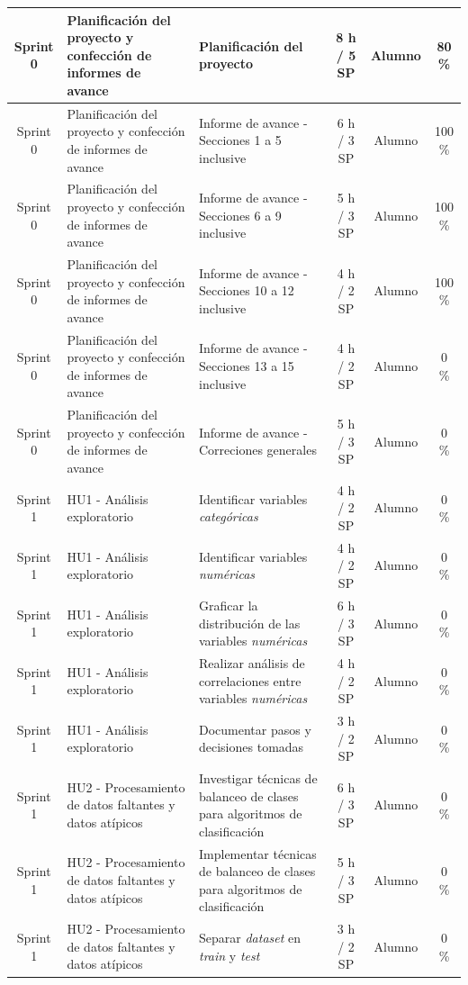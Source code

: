 \documentclass[
11pt, %
]{charter}
\begin{document}
\begin{xltabular}{\linewidth}{@{}|c|X|X|c|c|c|@{}}
\hline
\endlastfoot
Sprint 0 & Planificación del proyecto y confección de informes de avance & Planificación del proyecto & 8 h / 5 SP & Alumno & 80 \%\\ \hline
Sprint 0 & Planificación del proyecto y confección de informes de avance & Informe de avance - Secciones 1 a 5 inclusive  & 6 h / 3 SP & Alumno & 100 \% \\ \hline
Sprint 0 & Planificación del proyecto y confección de informes de avance & Informe de avance - Secciones 6 a 9 inclusive  & 5 h / 3 SP & Alumno & 100 \% \\ \hline
Sprint 0 & Planificación del proyecto y confección de informes de avance & Informe de avance - Secciones 10 a 12 inclusive  & 4 h / 2 SP & Alumno & 100 \% \\ \hline
Sprint 0 & Planificación del proyecto y confección de informes de avance & Informe de avance - Secciones 13 a 15 inclusive  & 4 h / 2 SP & Alumno & 0 \% \\ \hline
Sprint 0 & Planificación del proyecto y confección de informes de avance & Informe de avance - Correciones generales  & 5 h / 3 SP & Alumno & 0 \% \\ \hline
Sprint 1 & HU1 - Análisis exploratorio  & Identificar variables \textit{categóricas} & 4 h / 2 SP & Alumno & 0 \% \\ \hline
Sprint 1 & HU1 - Análisis exploratorio  & Identificar variables \textit{numéricas} & 4 h / 2 SP & Alumno & 0 \% \\ \hline
Sprint 1 & HU1 - Análisis exploratorio  & Graficar la distribución de las variables \textit{numéricas} & 6 h / 3 SP & Alumno & 0 \% \\ \hline
Sprint 1 & HU1 - Análisis exploratorio  & Realizar análisis de correlaciones entre variables \textit{numéricas}  & 4 h / 2 SP & Alumno & 0 \% \\ \hline
Sprint 1 & HU1 - Análisis exploratorio  & Documentar pasos y decisiones tomadas  & 3 h / 2 SP & Alumno & 0 \% \\ \hline
Sprint 1 & HU2 - Procesamiento de datos faltantes y datos atípicos & Investigar técnicas de balanceo de clases para algoritmos de clasificación  & 6 h / 3 SP & Alumno & 0 \% \\ \hline
Sprint 1 & HU2 - Procesamiento de datos faltantes y datos atípicos & Implementar técnicas de balanceo de clases para algoritmos de clasificación  & 5 h / 3 SP & Alumno & 0 \% \\ \hline
Sprint 1 & HU2 - Procesamiento de datos faltantes y datos atípicos & Separar \textit{dataset} en \textit{train} y \textit{test}  & 3 h / 2 SP & Alumno & 0 \% \\ \hline

\end{xltabular}
\end{document}
